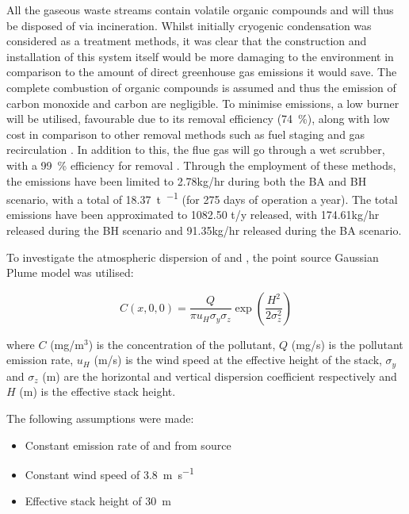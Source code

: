 All the gaseous waste 
streams contain volatile organic compounds and will thus be disposed of via incineration. Whilst initially cryogenic condensation was considered as a treatment methods, it was clear that the construction and installation of this system itself would be more damaging to the environment in comparison to the amount of direct greenhouse gas emissions it would save. The complete combustion of organic compounds is assumed and thus the emission of carbon monoxide and carbon are negligible. To minimise  emissions, a low  burner will be utilised, favourable due to its  removal efficiency (\SI{74}{\percent}), along with low cost in comparison to other  removal methods such as fuel staging and gas recirculation \cite{world_bank_group_pollution_1999}. In addition to this, the flue gas will go through a wet scrubber, with a \SI{99}{\percent} efficiency for  removal \cite{ceco_environmental_nox_nodate}. Through the employment of these methods, the  emissions have been limited to 2.78kg/hr during both the BA and BH scenario, with a total of \SI{18.37}{\tonne\per\year} (for 275 days of operation a year). The total  emissions have been approximated to 1082.50 t/y released, with 174.61kg/hr released during the BH scenario and 91.35kg/hr released during the BA scenario. 

To investigate the atmospheric dispersion of  and , the point source Gaussian Plume model was utilised:

\begin{equation}
C(x,0,0)= \frac{Q}{\pi u_{H} \sigma_{y} \sigma_{z}} \exp\left( \frac{H^2}{2\sigma_{z}^2}\right)
\end{equation}

\noindent where $C$ (mg/m$^3$) is the concentration of the pollutant, $Q$ (mg/s) is the pollutant emission rate, $u_H$ (m/s) is the wind speed at the effective height of the stack, $\sigma_{y}$ and $\sigma_{z}$ (m) are the horizontal and vertical dispersion coefficient respectively and $H$ (m) is the effective stack height. 

The following assumptions were made:

\begin{itemize}
\item Constant emission rate of  and  from source
\item Constant wind speed of \SI{3.8}{\m\per\s} \cite{weather_spark_average_nodate}
\item Effective stack height of \SI{30}{\m} 
\end{itemize}


